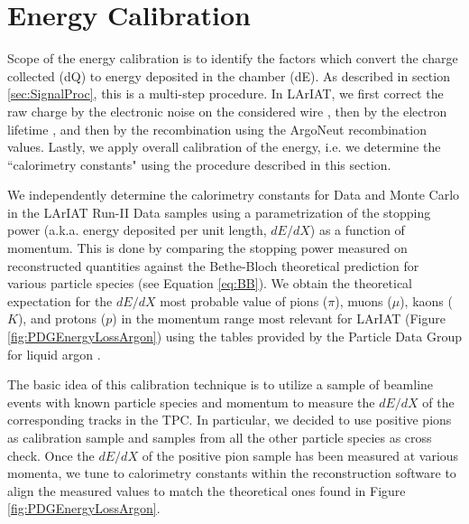 \chapter{Energy Calibration}\label{ch:energyCalibration}

Scope of the energy calibration is to identify the factors which convert the charge collected (dQ) to energy deposited in the chamber (dE). As described in section \ref{sec:SignalProc}, this is a multi-step procedure. In LArIAT, we first correct the raw charge by the electronic noise on the considered wire \cite{LArIATdqdx}, then by the electron lifetime \cite{LArIATLifeTime},  and then by the recombination using the ArgoNeut recombination values. Lastly, we apply overall calibration of the energy, i.e. we determine the ``calorimetry constants" using the procedure described in this section.


We independently determine  the calorimetry constants for Data and Monte Carlo in the LArIAT Run-II Data samples using  a parametrization of the stopping power (a.k.a. energy deposited per unit length, $dE/dX$)  as a function of momentum. This is done by comparing the stopping power measured on reconstructed quantities against the Bethe-Bloch theoretical prediction for various particle species (see Equation \ref{eq:BB}).  We obtain the theoretical expectation for the $dE/dX$ most probable value of pions ($\pi$), muons ($\mu$), kaons ($K$), and protons ($p$) in the momentum range most relevant for LArIAT (Figure \ref{fig:PDGEnergyLossArgon}) using the tables provided by the Particle Data Group \cite{Patrignani:2016xqp} for liquid argon \cite{PDG-Argon}.

The basic idea of this calibration technique is to utilize a sample of beamline events with known particle species and momentum to measure the $dE/dX$ of the corresponding tracks in the TPC. In particular, we decided to use positive pions as calibration sample and samples from all the other particle species as cross check. Once the $dE/dX$ of the positive pion sample  has been measured at various momenta, we tune to calorimetry constants within the reconstruction software to align the measured values to match the theoretical ones found in Figure \ref{fig:PDGEnergyLossArgon}. 

